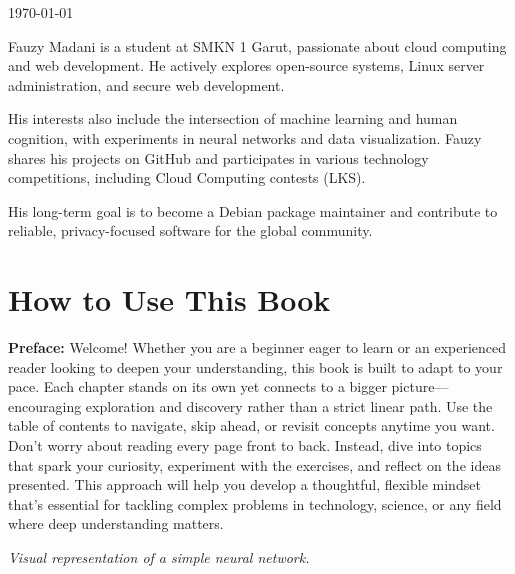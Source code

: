 \documentclass{book}
\begin{document}
\vfill

\begin{center}
  {\large \today} %
\end{center}

\vspace{2em}

\noindent Fauzy Madani is a student at SMKN 1 Garut, passionate about cloud computing and web development. He actively explores open-source systems, Linux server administration, and secure web development.

His interests also include the intersection of machine learning and human cognition, with experiments in neural networks and data visualization. Fauzy shares his projects on GitHub and participates in various technology competitions, including Cloud Computing contests (LKS).

His long-term goal is to become a Debian package maintainer and contribute to reliable, privacy-focused software for the global community.

\clearpage

\tableofcontents
\clearpage

\chapter{How to Use This Book}

\noindent
\textbf{Preface:}  
Welcome! Whether you are a beginner eager to learn or an experienced reader looking to deepen your understanding, this book is built to adapt to your pace. Each chapter stands on its own yet connects to a bigger picture—encouraging exploration and discovery rather than a strict linear path.  
Use the table of contents to navigate, skip ahead, or revisit concepts anytime you want. Don't worry about reading every page front to back. Instead, dive into topics that spark your curiosity, experiment with the exercises, and reflect on the ideas presented.  
This approach will help you develop a thoughtful, flexible mindset that’s essential for tackling complex problems in technology, science, or any field where deep understanding matters.

\begin{center}

\vspace{0.5cm}
{\itshape Visual representation of a simple neural network.}
\end{center}
\end{document}
